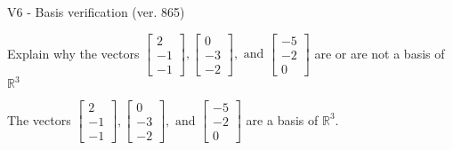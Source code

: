 \begin{exercise}
  \begin{exerciseTitle}V6 - Basis verification (ver. 865)\end{exerciseTitle}
  \begin{exerciseStatement}
    Explain why the vectors \(\left[\begin{array}{r}
2 \\
-1 \\
-1
\end{array}\right] , \left[\begin{array}{r}
0 \\
-3 \\
-2
\end{array}\right] , \text{ and } \left[\begin{array}{r}
-5 \\
-2 \\
0
\end{array}\right]\) are or are not a basis of \(\mathbb{R}^3\)	


  \end{exerciseStatement}
  \begin{exerciseAnswer}
   The vectors \(\left[\begin{array}{r}
2 \\
-1 \\
-1
\end{array}\right] , \left[\begin{array}{r}
0 \\
-3 \\
-2
\end{array}\right] , \text{ and } \left[\begin{array}{r}
-5 \\
-2 \\
0
\end{array}\right]\) 
  	 are  a basis of \(\mathbb{R}^3\).
  


  \end{exerciseAnswer}
\end{exercise}
